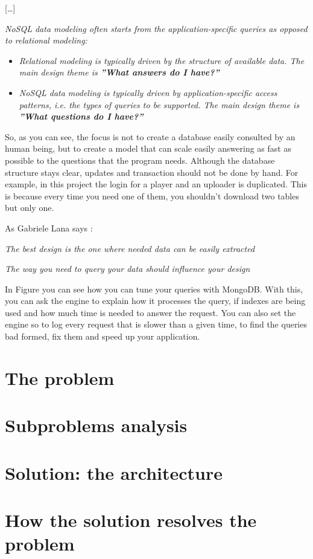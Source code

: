 \begin{center}
[\dots\unkern]
\end{center}

\textit{NoSQL data modeling often starts from the application-specific queries as opposed to relational modeling:}
\begin{itemize}
\item \textit{Relational modeling is typically driven by the structure of available data. The main design theme is  \textbf{”What answers do I have?”}}
\item \textit{NoSQL data modeling is typically driven by application-specific access patterns, i.e. the types of queries to be supported. The main design theme is \textbf{”What questions do I have?”}}
\end{itemize}

So, as you can see, the focus is not to create a database easily consulted by an human being, but to create a model that can scale easily answering as fast as possible to the questions that the program needs. Although the database structure stays clear, updates and transaction should not be done by hand. For example, in this project the login for a player and an uploader is duplicated. This is because every time you need one of them, you shouldn't download two tables but only one.

As Gabriele Lana says \cite{website:mongodbwithstyle}:

\begin{center}
	\textit{The best design is the one where needed data can be easily extracted}
\end{center}

\begin{center}
	\textit{The way you need to query your data should influence your design}
\end{center}


In Figure you can see how you can tune your queries with MongoDB. With this, you can ask the engine to explain how it processes the query, if indexes are being used and how much time is needed to answer the request. You can also set the engine so to log every request that is slower than a given time, to find the queries bad formed, fix them and speed up your application.


\section{The problem}

\section{Subproblems analysis}

\section{Solution: the architecture}

\section{How the solution resolves the problem}





